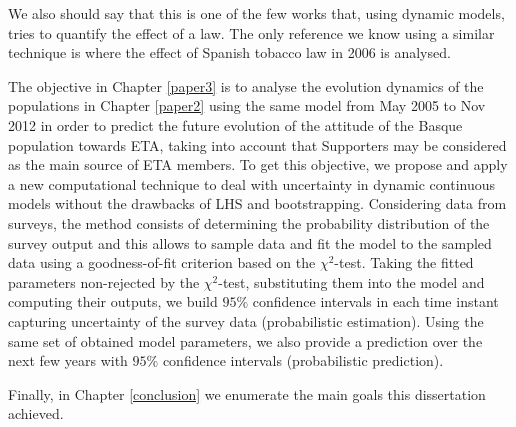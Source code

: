 We also should say that this is one of the few works that, using dynamic models, tries to quantify the effect of a law. The only reference we know using a similar technique is \cite{tabaco} where the effect of Spanish tobacco law in 2006 is analysed.

The objective in Chapter \ref{paper3} is to analyse the evolution dynamics of the populations in Chapter \ref{paper2} using the same model from May 2005 to Nov 2012 in order to predict the future evolution of the attitude of the Basque population towards ETA, taking into account that Supporters may be considered as the main source of ETA members. To get this objective, we propose and apply a new computational technique to deal with uncertainty in dynamic continuous models without the drawbacks of LHS and bootstrapping. Considering data from surveys, the method consists of determining the probability distribution of the survey output and this allows to sample data and fit the model to the sampled data using a goodness-of-fit criterion based on the $\chi^2$-test. Taking the fitted parameters non-rejected by the $\chi^2$-test, substituting them into the model and computing their outputs, we build $95\%$ confidence intervals in each time instant capturing uncertainty of the survey data (probabilistic estimation). Using the same set of obtained model parameters, we also provide a prediction over the next few years with $95\%$ confidence intervals (probabilistic prediction).

Finally, in Chapter \ref{conclusion} we enumerate the main goals this dissertation achieved. 
